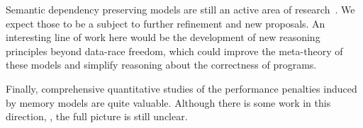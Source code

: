 Semantic dependency preserving models are still an active 
area of research~\cite{Kang-al:POPL17, Lee-al:PLDI20, Cho-al:PLDI21,
Chakraborty-Vafeiadis:POPL19, Paviotti-al:ESOP20, 
Jagadeesan-al:OOPSLA2020}. 
We expect those to be a subject to 
further refinement and new proposals. 
An interesting line of work here would be 
the development of new reasoning principles
beyond data-race freedom, which could 
improve the meta-theory of these models and 
simplify reasoning about the correctness of programs.   

Finally, comprehensive quantitative studies 
of the performance penalties induced by memory models are quite valuable.
Although there is some work in this direction,%
\cite{Singh-al:ISCA12, Liu-al:OOPSLA17, Liu-al:PLDI19, 
Vollmer-al:PPoPP17, Dolan-al:PLDI18, Ou-Demsky:OOPSLA18}, 
the full picture is still unclear.
